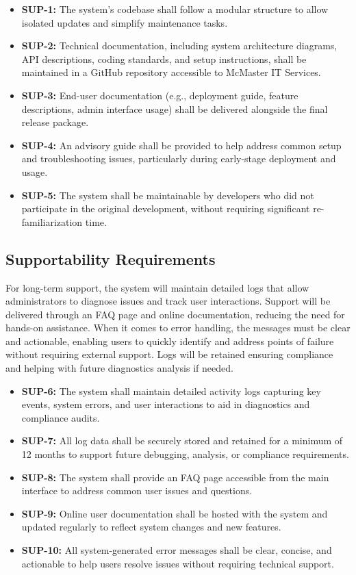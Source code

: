 \documentclass[12pt]{article}
\begin{document}
\begin{itemize}
    \item \textbf{SUP-1:} The system’s codebase shall follow a modular structure to allow isolated updates and simplify maintenance tasks.
    \item \textbf{SUP-2:} Technical documentation, including system architecture diagrams, API descriptions, coding standards, and setup instructions, shall be maintained in a GitHub repository accessible to McMaster IT Services.
    \item \textbf{SUP-3:} End-user documentation (e.g., deployment guide, feature descriptions, admin interface usage) shall be delivered alongside the final release package.
    \item \textbf{SUP-4:} An advisory guide shall be provided to help address common setup and troubleshooting issues, particularly during early-stage deployment and usage.
    \item \textbf{SUP-5:} The system shall be maintainable by developers who did not participate in the original development, without requiring significant re-familiarization time.
\end{itemize}

\subsection{Supportability Requirements}
For long-term support, the system will maintain detailed logs that allow administrators to diagnose issues and track user interactions. Support will be delivered through an FAQ page and online documentation, reducing the need for hands-on assistance. When it comes to error handling, the messages must be clear and actionable, enabling users to quickly identify and address points of failure without requiring external support. Logs will be retained ensuring compliance and helping with future diagnostics analysis if needed.

\begin{itemize}
    \item \textbf{SUP-6:} The system shall maintain detailed activity logs capturing key events, system errors, and user interactions to aid in diagnostics and compliance audits.
    \item \textbf{SUP-7:} All log data shall be securely stored and retained for a minimum of 12 months to support future debugging, analysis, or compliance requirements.
    \item \textbf{SUP-8:} The system shall provide an FAQ page accessible from the main interface to address common user issues and questions.
    \item \textbf{SUP-9:} Online user documentation shall be hosted with the system and updated regularly to reflect system changes and new features.
    \item \textbf{SUP-10:} All system-generated error messages shall be clear, concise, and actionable to help users resolve issues without requiring technical support.
\end{itemize}
\end{document}
